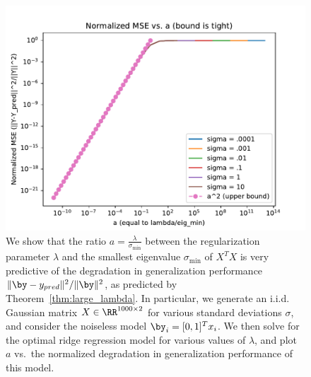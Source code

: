 \begin{figure}
	\begin{center}
		\centerline{\includegraphics[width=0.8\columnwidth]{figures/micro_large_sigma_min.pdf}}
		\caption{We show that the ratio $a=\frac{\lambda}{\sigma_{\min}}$ between the regularization parameter $\lambda$ and the smallest eigenvalue $\sigma_{\min}$ of $X^T X$ is very predictive of the degradation in generalization performance $\|\by - y_{pred}\|^2/\|\by\|^2$, as predicted by Theorem~\ref{thm:large_lambda}.
		In particular, we generate an i.i.d. Gaussian matrix $X\in \RR^{1000\times 2}$ for various standard deviations $\sigma$, and consider the noiseless model $\by_i = [0,1]^T x_i$.
		We then solve for the optimal ridge regression model for various values of $\lambda$, and plot $a$ vs.\ the normalized degradation in generalization performance of this model. 
		}
		\label{fig:micro_large_sigma_min}
	\end{center}
\end{figure}

